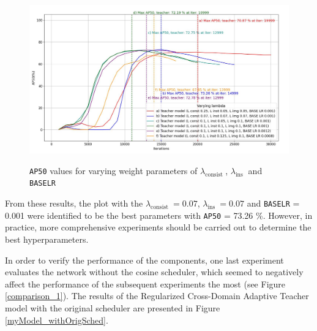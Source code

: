 \documentclass[english, 12pt, a4paper, elec, utf8, a-1b, online]{aaltothesis}
\begin{document}
\begin{figure}[htb]
	\begin{center}
		\includegraphics[width=14cm]{./AP50_varying_lambda.jpg}
	\end{center}
	\caption{\texttt{AP50} values for varying weight parameters of $\lambda_{\text {consist }}$, $\lambda_{\text {ins }}$ and \texttt{BASE\textunderscore LR}}
	\begin{center}
		\label{myModel_varying_params}
	\end{center}
\end{figure}
\FloatBarrier  
From these results, the plot with the $\lambda_{\text {consist }} = 0.07$, $\lambda_{\text {ins }} = 0.07$ and \texttt{BASE\textunderscore LR} = 0.001 were identified to be the best parameters with \texttt{AP50} = 73.26 \%. However, in practice, more comprehensive experiments should be carried out to determine the best hyperparameters. 

In order to verify the performance of the components, one last experiment evaluates the network without the cosine scheduler, which seemed to negatively affect the performance of the subsequent experiments the most (see Figure \ref{comparison_1}). The results of the Regularized Cross-Domain Adaptive Teacher model with the original scheduler are presented in Figure \ref{myModel_withOrigSched}.
\end{document}
